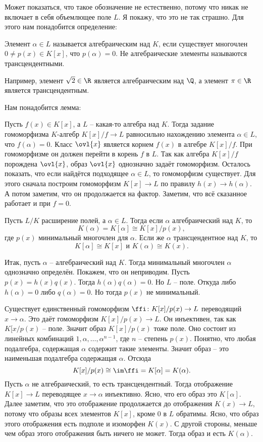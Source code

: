 Может показаться, что такое обозначение не естественно, потому что никак не включает в себя объемлющее поле $L$. Я покажу, что это не так страшно. Для этого нам понадобится определение:

\dfn Элемент $\alpha \in L$ называется алгебраическим над $K$, если существует многочлен $0\neq p(x)\in K[x]$, что $p(\alpha)=0$. Не алгебраические элементы называются трансцендентными.
\edfn 

Например, элемент $\sqrt{2} \in \R$ является алгебраическим над $\Q$, а элемент $\pi\in \R$ является трансцендентным.

Нам понадобится лемма:

\lm Пусть $f(x) \in K[x]$, а $L$ -- какая-то алгебра над $K$. Тогда задание  гомоморфизма $K$-алгебр $K[x]/f \to L$ равносильно нахождению элемента $\alpha \in L$, что $f(\alpha)=0$.
\elm
\proof Класс $\ovl{x}$ является корнем $f(x)$ в алгебре $K[x]/f$. При гомоморфизме он должен перейти в корень $f$ в $L$. Так как алгебра $K[x]/f$ порождена $\ovl{x}$, образ $\ovl{x}$ однозначно задаёт гомоморфизм. 
Осталось показать, что если найдётся подходящее $\alpha\in L$, то гомоморфизм существует. Для этого сначала построим гомоморфизм $K[x] \to L$ по правилу $h(x) \to h(\alpha)$. А потом заметим, что он продолжается на фактор. Заметим, что всё сказанное работает и при $f=0$.
\endproof


\thrm Пусть $L/K$ расширение полей, а $\alpha \in L$. Тогда если $\alpha$ алгебраический над $K$, то 
$$K(\alpha)=K[\alpha]\cong K[x]/p(x),$$
 где $p(x)$ минимальный многочлен для $\alpha.$
Если же $\alpha$ трансцендентное над $K$, то $$K[\alpha]\cong K[x] \text{ и } K(\alpha) \cong K(x).$$
\ethrm


\proof Итак, пусть $\alpha$ -- алгебраический над $ K$. Тогда минимальный многочлен $\alpha$ однозначно определён. Покажем, что он неприводим. Пусть $p(x)=h(x)q(x)$. Тогда $h(\alpha)q(\alpha)=0$. Но $L$ -- поле. Откуда либо $h(\alpha)=0$ либо $q(\alpha)=0$. Но тогда $p(x)$ не минимальный.

Существует единственный гомоморфизм $\ffi \colon K[x]/p(x) \to L$ переводящий $x \to \alpha$.  Это даёт гомоморфизм $K[x]/p(x) \to L$. Он инъективен, так как $K[x/p(x)$ -- поле. Значит  образ $K[x]/p(x)$ тоже поле. Оно состоит из линейных комбинаций $1,\alpha,\dots,\alpha^{n-1}$, где $n$ -- степень $p(x)$. Понятно, что любая подалгебра, содержащая $\alpha$ содержит такие элементы. Значит образ -- это наименьшая подалгебра содержащая $\alpha$. Отсюда
$$K[x]/p(x) \cong \im \ffi = K[\alpha]=K(\alpha).$$
Пусть $\alpha$ не алгебраический, то есть трансцендентный. Тогда отображение $K[x] \to L$ переводящее $x\to\alpha$ инъективно. Ясно, что его образ это $K[\alpha]$. Далее заметим, что это отображение продолжается до отображения $K(x) \to L$, потому что образы всех элементов $K[x]$, кроме 0 в $L$ обратимы. Ясно, что образ этого отображения есть подполе и изоморфен $K(x)$. С другой стороны, меньше чем образ этого отображения быть ничего не может. Тогда образ и есть $K(\alpha)$. 
\endproof

